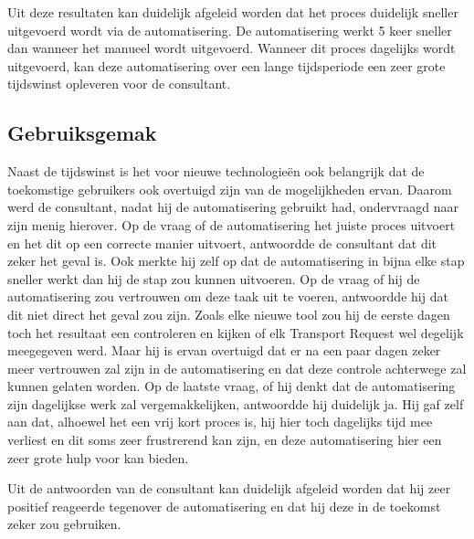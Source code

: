 Uit deze resultaten kan duidelijk afgeleid worden dat het proces duidelijk sneller uitgevoerd wordt via de automatisering. De automatisering werkt 5 keer sneller dan wanneer het manueel wordt uitgevoerd.
Wanneer dit proces dagelijks wordt uitgevoerd, kan deze automatisering over een lange tijdsperiode een zeer grote tijdswinst opleveren voor de consultant.

\subsection{Gebruiksgemak}
\label{subsec:gebruiksgemak}

Naast de tijdswinst is het voor nieuwe technologieën ook belangrijk dat de toekomstige gebruikers ook overtuigd zijn van de mogelijkheden ervan. Daarom werd de consultant, nadat hij de automatisering gebruikt had, ondervraagd naar zijn menig hierover.
Op de vraag of de automatisering het juiste proces uitvoert en het dit op een correcte manier uitvoert, antwoordde de consultant dat dit zeker het geval is. Ook merkte hij zelf op dat de automatisering in bijna elke stap sneller werkt dan hij de stap zou kunnen uitvoeren.
Op de vraag of hij de automatisering zou vertrouwen om deze taak uit te voeren, antwoordde hij dat dit niet direct het geval zou zijn. Zoals elke nieuwe tool zou hij de eerste dagen toch het resultaat een controleren en kijken of elk Transport Request wel degelijk meegegeven werd. Maar hij is ervan overtuigd dat er na een paar dagen zeker meer vertrouwen zal zijn in de automatisering en dat deze controle achterwege zal kunnen gelaten worden.
Op de laatste vraag, of hij denkt dat de automatisering zijn dagelijkse werk zal vergemakkelijken, antwoordde hij duidelijk ja. Hij gaf zelf aan dat, alhoewel het een vrij kort proces is, hij hier toch dagelijks tijd mee verliest en dit soms zeer frustrerend kan zijn, en deze automatisering hier een zeer grote hulp voor kan bieden.

Uit de antwoorden van de consultant kan duidelijk afgeleid worden dat hij zeer positief reageerde tegenover de automatisering en dat hij deze in de toekomst zeker zou gebruiken.